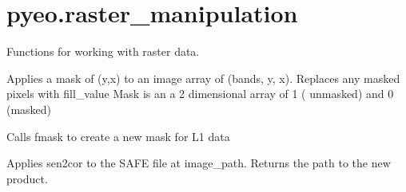 \documentclass[letterpaper,10pt,english]{sphinxmanual}
\begin{document}
\label{\detokenize{index:module-pyeo.raster_manipulation}}

\section{pyeo.raster\_manipulation}
\label{\detokenize{index:pyeo-raster-manipulation}}
Functions for working with raster data.

\begin{fulllineitems}
\label{\detokenize{index:pyeo.raster_manipulation.apply_array_image_mask}}
Applies a mask of (y,x) to an image array of (bands, y, x). Replaces any masked pixels with fill\_value
Mask is an a 2 dimensional array of 1 ( unmasked) and 0 (masked)

\end{fulllineitems}


\begin{fulllineitems}
\label{\detokenize{index:pyeo.raster_manipulation.apply_fmask}}
Calls fmask to create a new mask for L1 data

\end{fulllineitems}


\begin{fulllineitems}
\label{\detokenize{index:pyeo.raster_manipulation.apply_sen2cor}}
Applies sen2cor to the SAFE file at image\_path. Returns the path to the new product.

\end{fulllineitems}
\end{document}
